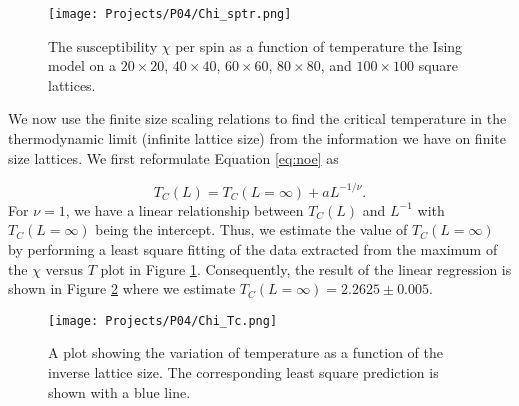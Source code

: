 \documentclass[a4paper]{article}
\begin{document}
\begin{figure}[H]
  \centering
  \texttt{[image: Projects/P04/Chi\_sptr.png]}
  \caption{The susceptibility $\chi$ per spin as a function of temperature the Ising model on a $20\times20$, $40\times40$, $60\times60$, $80\times80$, and $100\times100$ square lattices.}
   \label{Chi_sptr}
\end{figure}

We now use the finite size scaling relations to find the critical temperature in the thermodynamic limit (infinite lattice size) from the information we have on finite size lattices. We first reformulate Equation \ref{eq:noe} as

\begin{equation}
  T_C(L) = T_C(L=\infty) + aL^{-1/\nu} \label{eq:noe2}.
\end{equation}
For $\nu=1$, we have a linear relationship between $T_C(L)$ and $L^{-1}$ with $T_C(L=\infty)$ being the intercept. Thus, we estimate the value of $T_C(L=\infty)$ by performing a least square fitting of the data extracted from the maximum of the $\chi$ versus $T$ plot in Figure \ref{Chi_sptr}. Consequently, the result of the linear regression is shown in Figure \ref{Chi_Tc} where we estimate $T_C(L=\infty)=2.2625 \pm 0.005$.

\begin{figure}[H]
  \centering
  \texttt{[image: Projects/P04/Chi\_Tc.png]}
  \caption{A plot showing the variation of temperature as a function of the inverse lattice size. The corresponding least square prediction is shown with a blue line.}
   \label{Chi_Tc}
\end{figure}
\end{document}
